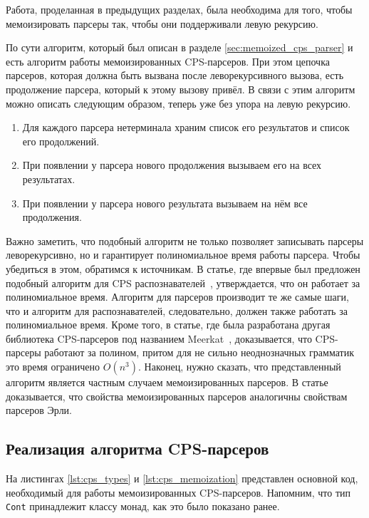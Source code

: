 \documentclass[times]{itmo-student-thesis}
\begin{document}
Работа, проделанная в предыдущих разделах, была необходима для того, чтобы мемоизировать парсеры так, чтобы они поддерживали
левую рекурсию. 

По сути алгоритм, который был описан в разделе \ref{sec:memoized_cps_parser} и есть алгоритм работы мемоизированных CPS-парсеров. 
При этом цепочка парсеров, которая должна быть вызвана после леворекурсивного вызова, есть продолжение парсера, 
который к этому вызову привёл. В связи с этим алгоритм можно описать следующим образом, теперь уже без упора на левую рекурсию.
\begin{enumerate}
    \item Для каждого парсера нетерминала храним список его результатов и список его продолжений.
    \item При появлении у парсера нового продолжения вызываем его на всех результатах.
    \item При появлении у парсера нового результата вызываем на нём все продолжения.
\end{enumerate}

Важно заметить, что подобный алгоритм не только позволяет записывать парсеры леворекурсивно, но и гарантирует
полиномиальное время работы парсера. Чтобы убедиться в этом, обратимся к источникам. В статье, где впервые был предложен подобный алгоритм для CPS
распознавателей~\cite{johnson_memoization_1995}, утверждается, что он работает  за полиномиальное время. Алгоритм для парсеров
производит те же самые шаги, что и алгоритм для распознавателей, следовательно,  должен также работать за полиномиальное
время. Кроме того, в статье, где была разработана другая библиотека CPS-парсеров под названием Meerkat~\cite{izmaylova_practical_2016},  доказывается,
что CPS-парсеры работают за полином, притом для не сильно неоднозначных грамматик это время ограничено
$O(n^3)$. Наконец, нужно сказать, что представленный алгоритм является частным случаем мемоизированных
парсеров. В статье~\cite{norvig_techniques_1991} доказывается, что свойства мемоизированных парсеров аналогичны свойствам
парсеров Эрли.

\subsection{Реализация алгоритма CPS-парсеров}

На листингах \ref{lst:cps_types} и \ref{lst:cps_memoization} представлен основной код, необходимый для работы мемоизированных CPS-парсеров. Напомним,
что тип \lstinline{Cont} принадлежит классу монад, как это было показано ранее.
\end{document}
